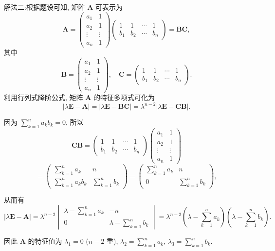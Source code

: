\documentclass[../../main.tex]{subfiles}%
\begin{document}
\begin{solution}
{\color{blue}解法二:}根据题设可知, 矩阵 $\boldsymbol{A}$ 可表示为
$$
\boldsymbol{A} = \begin{pmatrix} a_1 & 1 \\ a_2 & 1 \\ \vdots & \vdots \\ a_n & 1 \end{pmatrix} \begin{pmatrix} 1 & 1 & \cdots & 1 \\ b_1 & b_2 & \cdots & b_n \end{pmatrix} = \boldsymbol{B}\boldsymbol{C},
$$
其中
$$
\boldsymbol{B} = \begin{pmatrix} a_1 & 1 \\ a_2 & 1 \\ \vdots & \vdots \\ a_n & 1 \end{pmatrix}, \quad \boldsymbol{C} = \begin{pmatrix} 1 & 1 & \cdots & 1 \\ b_1 & b_2 & \cdots & b_n \end{pmatrix}.
$$
利用行列式降阶公式, 矩阵 $\boldsymbol{A}$ 的特征多项式可化为
$$
|\lambda\boldsymbol{E} - \boldsymbol{A}| = |\lambda\boldsymbol{E} - \boldsymbol{B}\boldsymbol{C}| = \lambda^{n - 2}|\lambda\boldsymbol{E} - \boldsymbol{C}\boldsymbol{B}|.
$$

因为 $\sum_{k = 1}^n a_kb_k = 0$, 所以
$$
\boldsymbol{C}\boldsymbol{B} = \begin{pmatrix} 1 & 1 & \cdots & 1 \\ b_1 & b_2 & \cdots & b_n \end{pmatrix} \begin{pmatrix} a_1 & 1 \\ a_2 & 1 \\ \vdots & \vdots \\ a_n & 1 \end{pmatrix}
$$
$$
= \begin{pmatrix} \sum_{k = 1}^n a_k & n \\ \sum_{k = 1}^n a_kb_k & \sum_{k = 1}^n b_k \end{pmatrix} = \begin{pmatrix} \sum_{k = 1}^n a_k & n \\ 0 & \sum_{k = 1}^n b_k \end{pmatrix},
$$

从而有
$$
|\lambda\boldsymbol{E} - \boldsymbol{A}| = \lambda^{n - 2} \begin{vmatrix} \lambda - \sum_{k = 1}^n a_k & -n \\ 0 & \lambda - \sum_{k = 1}^n b_k \end{vmatrix} = \lambda^{n - 2} \left( \lambda - \sum_{k = 1}^n a_k \right) \left( \lambda - \sum_{k = 1}^n b_k \right).
$$

因此 $\boldsymbol{A}$ 的特征值为 $\lambda_1 = 0$ ($n - 2$ 重), $\lambda_2 = \sum_{k = 1}^n a_k$, $\lambda_3 = \sum_{k = 1}^n b_k$.

\end{solution}
\end{document}
